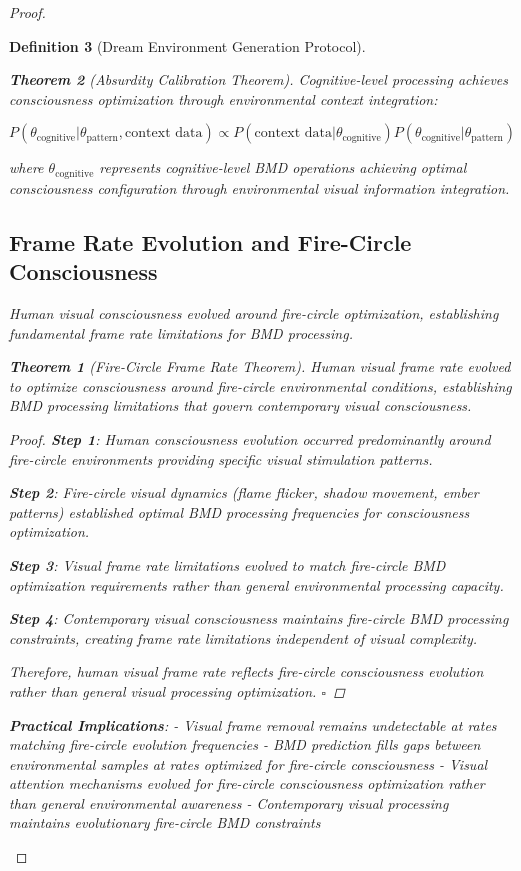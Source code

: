 \documentclass[12pt,a4paper]{article}
\newtheorem{theorem}{Theorem}[section]
\newtheorem{definition}[theorem]{Definition}
\begin{document}
\begin{proof}
\begin{definition}[Dream Environment Generation Protocol]
\begin{theorem}[Absurdity Calibration Theorem]
Cognitive-level processing achieves consciousness optimization through environmental context integration:

$$P(\theta_{\text{cognitive}} | \theta_{\text{pattern}}, \text{context data}) \propto P(\text{context data} | \theta_{\text{cognitive}}) P(\theta_{\text{cognitive}} | \theta_{\text{pattern}})$$

where $\theta_{\text{cognitive}}$ represents cognitive-level BMD operations achieving optimal consciousness configuration through environmental visual information integration.

\subsection{Frame Rate Evolution and Fire-Circle Consciousness}

Human visual consciousness evolved around fire-circle optimization, establishing fundamental frame rate limitations for BMD processing.

\begin{theorem}[Fire-Circle Frame Rate Theorem]
Human visual frame rate evolved to optimize consciousness around fire-circle environmental conditions, establishing BMD processing limitations that govern contemporary visual consciousness.
\end{theorem}

\begin{proof}
\textbf{Step 1}: Human consciousness evolution occurred predominantly around fire-circle environments providing specific visual stimulation patterns.

\textbf{Step 2}: Fire-circle visual dynamics (flame flicker, shadow movement, ember patterns) established optimal BMD processing frequencies for consciousness optimization.

\textbf{Step 3}: Visual frame rate limitations evolved to match fire-circle BMD optimization requirements rather than general environmental processing capacity.

\textbf{Step 4}: Contemporary visual consciousness maintains fire-circle BMD processing constraints, creating frame rate limitations independent of visual complexity.

Therefore, human visual frame rate reflects fire-circle consciousness evolution rather than general visual processing optimization. $\square$
\end{proof}

\textbf{Practical Implications}:
- Visual frame removal remains undetectable at rates matching fire-circle evolution frequencies
- BMD prediction fills gaps between environmental samples at rates optimized for fire-circle consciousness
- Visual attention mechanisms evolved for fire-circle consciousness optimization rather than general environmental awareness
- Contemporary visual processing maintains evolutionary fire-circle BMD constraints


\end{theorem}
\end{definition}
\end{proof}
\end{document}
